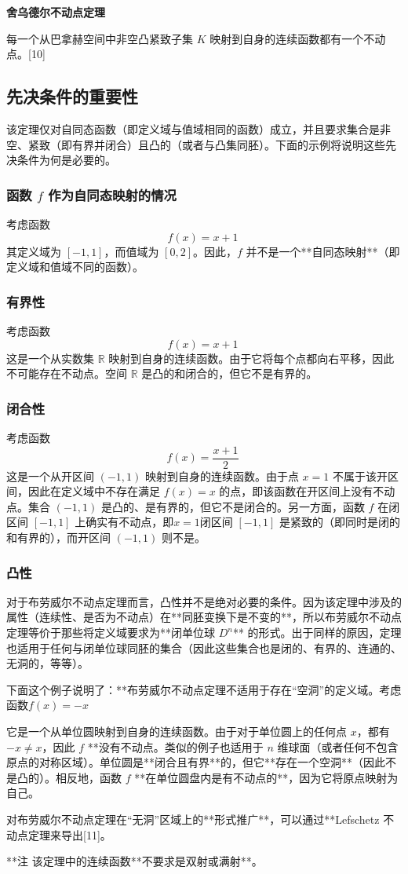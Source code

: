\textbf{舍乌德尔不动点定理}

每一个从巴拿赫空间中非空凸紧致子集 $K$ 映射到自身的连续函数都有一个不动点。[10]
\subsection{先决条件的重要性}
该定理仅对自同态函数（即定义域与值域相同的函数）成立，并且要求集合是非空、紧致（即有界并闭合）且凸的（或者与凸集同胚）。下面的示例将说明这些先决条件为何是必要的。
\subsubsection{函数 $f$ 作为自同态映射的情况}
考虑函数
$$
f(x) = x + 1~
$$
其定义域为 $[-1, 1]$，而值域为 $[0, 2]$。因此，$f$ 并不是一个**自同态映射**（即定义域和值域不同的函数）。
\subsubsection{有界性}
考虑函数
$$
f(x) = x + 1~
$$
这是一个从实数集 $\mathbb{R}$ 映射到自身的连续函数。由于它将每个点都向右平移，因此不可能存在不动点。空间 $\mathbb{R}$ 是凸的和闭合的，但它不是有界的。
\subsubsection{闭合性}
考虑函数
$$
f(x) = \frac{x + 1}{2}~
$$
这是一个从开区间 $(-1, 1)$ 映射到自身的连续函数。由于点 $x = 1$ 不属于该开区间，因此在定义域中不存在满足 $f(x) = x$ 的点，即该函数在开区间上没有不动点。集合 $(-1, 1)$ 是凸的、是有界的，但它不是闭合的。另一方面，函数 $f$ 在闭区间 $[-1, 1]$ 上确实有不动点，即$x = 1$闭区间 $[-1, 1]$ 是紧致的（即同时是闭的和有界的），而开区间 $(-1, 1)$ 则不是。
\subsubsection{凸性}
对于布劳威尔不动点定理而言，凸性并不是绝对必要的条件。因为该定理中涉及的属性（连续性、是否为不动点）在**同胚变换下是不变的**，所以布劳威尔不动点定理等价于那些将定义域要求为**闭单位球 $D^n$** 的形式。出于同样的原因，定理也适用于任何与闭单位球同胚的集合（因此这些集合也是闭的、有界的、连通的、无洞的，等等）。

下面这个例子说明了：**布劳威尔不动点定理不适用于存在“空洞”的定义域。考虑函数$f(x) = -x$

它是一个从单位圆映射到自身的连续函数。由于对于单位圆上的任何点 $x$，都有 $-x \ne x$，因此 $f$ **没有不动点。类似的例子也适用于 $n$ 维球面（或者任何不包含原点的对称区域）。单位圆是**闭合且有界**的，但它**存在一个空洞**（因此不是凸的）。相反地，函数 $f$ **在单位圆盘内是有不动点的**，因为它将原点映射为自己。

对布劳威尔不动点定理在“无洞”区域上的**形式推广**，可以通过**Lefschetz 不动点定理来导出[11]。



**注
该定理中的连续函数**不要求是双射或满射**。
